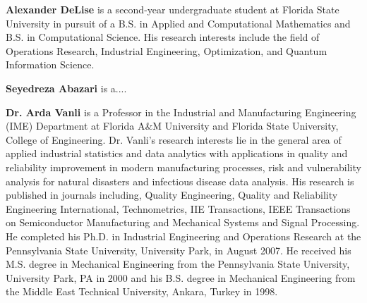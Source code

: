 \documentclass{article}
\begin{document}
\printbibliography[heading=subbibintoc, title={References}]


\begin{ieombiography}
  \textbf{Alexander DeLise} is a second-year undergraduate student at Florida State University in pursuit of a B.S. in Applied and Computational Mathematics and B.S. in Computational Science. His research interests include the field of Operations Research, Industrial Engineering, Optimization, and Quantum Information Science. 

  \noindent \textbf{Seyedreza Abazari} is a....

  \noindent \textbf{Dr. Arda Vanli} is a Professor in the Industrial and Manufacturing Engineering (IME) Department at Florida A\&M University and Florida State University, College of Engineering. Dr. Vanli's research interests lie in the general area of applied industrial statistics and data analytics with applications in quality and reliability improvement in modern manufacturing processes, risk and vulnerability analysis for natural disasters and infectious disease data analysis. His research is published in journals including, Quality Engineering, Quality and Reliability Engineering International, Technometrics, IIE Transactions, IEEE Transactions on Semiconductor Manufacturing and Mechanical Systems and Signal Processing. He completed his Ph.D. in Industrial Engineering and Operations Research at the Pennsylvania State University, University Park, in August 2007. He received his M.S. degree in Mechanical Engineering from the Pennsylvania State University, University Park, PA in 2000 and his B.S. degree in Mechanical Engineering from the Middle East Technical University, Ankara, Turkey in 1998.
\end{ieombiography}
 
\end{document}
